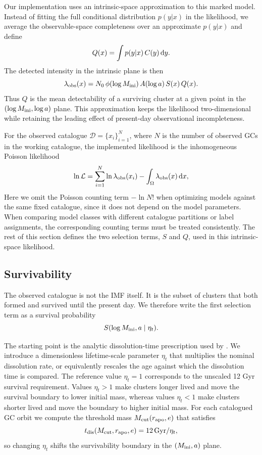 \documentclass[fleqn,usenatbib]{mnras}
\begin{document}
Our implementation uses an intrinsic-space approximation to this marked model. Instead of fitting the full conditional distribution $p(y|x)$ in the likelihood, we average the observable-space completeness over an approximate $p(y|x)$ and define
\begin{equation}
Q(x)=\int p(y|x)\,C(y)\,{\rm d}y.
\end{equation}
The detected intensity in the intrinsic plane is then
\begin{equation}
\lambda_{\rm obs}(x)
=
N_0\,\phi(\log M_{\rm ini})\,A(\log a)\,S(x)\,Q(x).
\end{equation}
Thus $Q$ is the mean detectability of a surviving cluster at a given point in the $(\log M_{\rm ini},\log a)$ plane. This approximation keeps the likelihood two-dimensional while retaining the leading effect of present-day observational incompleteness.

For the observed catalogue $\mathcal{D}=\{x_i\}_{i=1}^{N}$, where $N$ is the number of observed GCs in the working catalogue, the implemented likelihood is the inhomogeneous Poisson likelihood
\begin{equation}
\ln \mathcal{L}
=
\sum_{i=1}^{N} \ln \lambda_{\rm obs}(x_i)
-
\int_{\Omega} \lambda_{\rm obs}(x)\,{\rm d}x,
\end{equation}
Here we omit the Poisson counting term $-\ln N!$ when optimizing models against the same fixed catalogue, since it does not depend on the model parameters. When comparing model classes with different catalogue partitions or label assignments, the corresponding counting terms must be treated consistently. The rest of this section defines the two selection terms, $S$ and $Q$, used in this intrinsic-space likelihood.

\subsection{Survivability}\label{sec:survival}
The observed catalogue is not the IMF itself. It is the subset of clusters that both formed and survived until the present day. We therefore write the first selection term as a survival probability
\begin{equation}
S(\log M_{\rm ini}, a \mid \eta_t).
\end{equation}

The starting point is the analytic dissolution-time prescription used by \citet{Baumgardt2019}. We introduce a dimensionless lifetime-scale parameter $\eta_t$ that multiplies the nominal dissolution rate, or equivalently rescales the age against which the dissolution time is compared. The reference value $\eta_t=1$ corresponds to the unscaled 12 Gyr survival requirement. Values $\eta_t>1$ make clusters longer lived and move the survival boundary to lower initial mass, whereas values $\eta_t<1$ make clusters shorter lived and move the boundary to higher initial mass. For each catalogued GC orbit we compute the threshold mass $M_{\rm cut}(r_{\rm apo}, e)$ that satisfies
\begin{equation}
t_{\rm dis}(M_{\rm cut}, r_{\rm apo}, e)=12\,{\rm Gyr}/\eta_t,
\end{equation}
so changing $\eta_t$ shifts the survivability boundary in the $(M_{\rm ini},a)$ plane.
\end{document}
